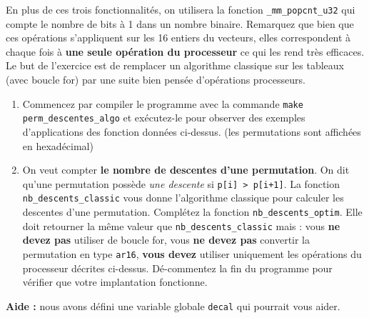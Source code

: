 \documentclass{cours}
\newcommand{\lsti}[1]{\lstinline{#1}{}}
\begin{document}
\begin{exercice}
En plus de ces trois fonctionnalités, on utilisera la fonction \lsti{_mm_popcnt_u32} qui compte le nombre de bits à 1 dans un nombre binaire. Remarquez que bien que ces opérations s'appliquent sur les 16 entiers du vecteurs, elles correspondent à chaque fois à \textbf{une seule opération du processeur} ce qui les rend très efficaces. Le but de l'exercice est de remplacer un algorithme classique sur les tableaux (avec boucle for) par une suite bien pensée d'opérations processeurs. 

\begin{enumerate}
\item Commencez par compiler le programme avec la commande \lsti{make perm_descentes_algo} et exécutez-le pour observer des exemples d'applications des fonction données ci-dessus. (les permutations sont affichées en hexadécimal)

\item On veut compter \textbf{le nombre de descentes d'une permutation}. On dit qu'une permutation possède \textit{une descente} si \lsti{p[i] > p[i+1]}. La fonction \lsti{nb_descents_classic} vous donne l'algorithme classique pour calculer les descentes d'une permutation. Complétez la fonction \lsti{nb_descents_optim}. Elle doit retourner la même valeur que \lsti{nb_descents_classic} mais : vous \textbf{ne devez pas} utiliser de boucle for, vous \textbf{ne devez pas} convertir la permutation en type \lsti{ar16}, \textbf{vous devez} utiliser uniquement les opérations du processeur décrites ci-dessus. Dé-commentez la fin du programme pour vérifier que votre implantation fonctionne.
\end{enumerate} 

\textbf{Aide : } nous avons défini une variable globale \lsti{decal} qui pourrait vous aider.

\end{exercice}
\end{document}
